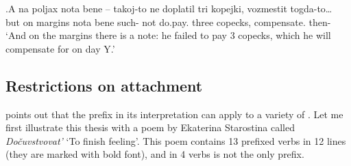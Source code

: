\exg.\label{ex:do:measure}A na poljax nota bene -- takoj-to ne doplatil tri kopejki, vozmestit togda-to…\\
but on margins nota bene {} such- not do.pay. three copecks, compensate. then-\\
\trans `And on the margins there is a note: he failed to pay 3 copecks, which he will compensate for on day Y.'

\subsection{Restrictions on attachment}
\citet[236]{Kagan:12} points out that the prefix  in its  interpretation can apply to a variety of . Let me first illustrate this thesis with a poem by Ekaterina Starostina called \textit{Do\v{c}uvstvovat'} `To finish feeling'. This poem contains 13 prefixed verbs in 12 lines (they are marked with bold font), and in 4 verbs  is not the only prefix.

